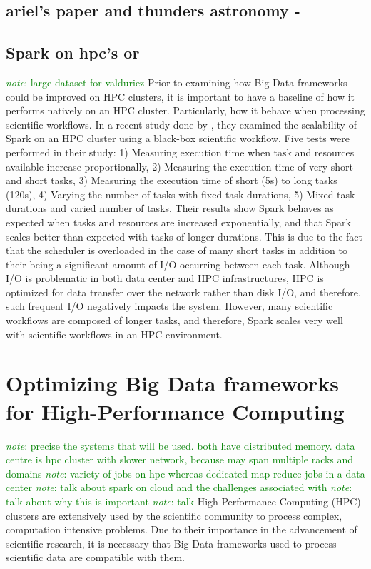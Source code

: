 \documentclass{report}
\newcommand{\note}[1]{\textcolor{green}{\textit{note}: #1}}
\begin{document}
    \section{ariel's paper and thunders astronomy - }
    \section{Spark on hpc's or } 
        \note{large dataset for valduriez} Prior to
examining how Big Data frameworks could be improved on HPC clusters, it is
important to have a baseline of how it performs natively on an HPC cluster.
Particularly, how it behave when processing scientific workflows. In a recent
study done by \cite{valduriez}, they examined the scalability of Spark on an HPC
cluster using a black-box scientific workflow. Five tests were performed in
their study: 1) Measuring execution time when task and resources available
increase proportionally, 2) Measuring the execution time of very short and short
tasks, 3) Measuring the execution time of short (5s) to long tasks (120s), 4)
Varying the number of tasks with fixed task durations, 5) Mixed task durations
and varied number of tasks. Their results show Spark behaves as expected when
tasks and resources are increased exponentially, and that Spark scales better
than expected with tasks of longer durations. This is due to the fact that the
scheduler is overloaded in the case of many short tasks in addition to their
being a significant amount of I/O occurring between each task. Although I/O is
problematic in both data center and HPC infrastructures, HPC is optimized for
data transfer over the network rather than disk I/O, and therefore, such
frequent I/O negatively impacts the system. However, many scientific workflows
are composed of longer tasks, and therefore, Spark scales very well with
scientific workflows in an HPC environment.

\chapter{Optimizing Big Data frameworks for High-Performance Computing}
	
    \note{precise the systems that will be used. both have distributed memory.
data centre is hpc cluster with slower network, because may span multiple racks
and domains} \note{variety of jobs on hpc whereas dedicated map-reduce jobs in a
data center} \note{talk about spark on cloud and the challenges associated with}
\note{talk about why this is important} \note{talk } High-Performance Computing
(HPC) clusters are extensively used by the scientific community to process
complex, computation intensive problems. Due to their importance in the
advancement of scientific research, it is necessary that Big Data frameworks
used to process scientific data are compatible with them. 
	
\end{document}
